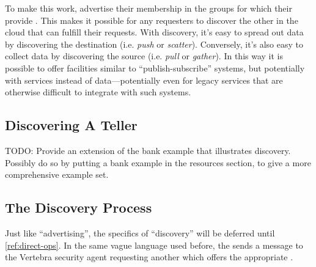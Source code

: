 To make this work, \agents{} advertise their membership in the groups for which their \actors{} provide \resources{}.  This makes it possible for any requesters to discover the other \agents{} in the cloud that can fulfill their requests.  With discovery, it's easy to spread out data by discovering the destination (i.e. \emph{push} or \emph{scatter}).  Conversely, it's also easy to collect data by discovering the source (i.e. \emph{pull} or \emph{gather}).  In this way it is possible to offer facilities similar to ``publish-subscribe'' systems, but potentially with services instead of data---potentially even for legacy services that are otherwise difficult to integrate with such systems.

\subsection{Discovering A Teller}

TODO: Provide an extension of the bank example that illustrates discovery.  Possibly do so by putting a bank example in the resources section, to give a more comprehensive example set.

\subsection{The Discovery Process}

Just like ``advertising'', the specifics of ``discovery'' will be deferred until \ref{ref:direct-ops}.  In the same vague language used before, the \agent{} sends a message to the Vertebra security agent requesting another \agent{} which offers the appropriate \resources{}.

